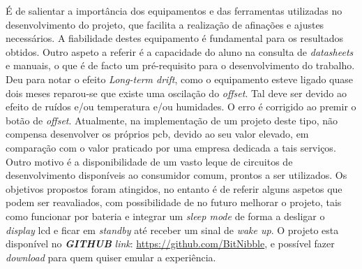 \emptyline
É de salientar a importância dos equipamentos e das ferramentas utilizadas no desenvolvimento do projeto, que facilita a realização de afinações e ajustes necessários. A fiabilidade destes equipamento é fundamental para os resultados obtidos.
Outro aspeto a referir é a capacidade do aluno na consulta de \textit{datasheets} e manuais, o que é de facto um pré-requisito para o desenvolvimento do trabalho.
\emptyline
Deu para notar o efeito \textit{Long-term drift}, como o equipamento esteve ligado quase dois meses reparou-se que existe uma oscilação do \textit{offset}. Tal deve ser devido ao efeito de ruídos e/ou temperatura e/ou humidades. O erro é corrigido ao premir o botão de \textit{offset}.
\emptyline
Atualmente, na implementação de um projeto deste tipo, não compensa desenvolver os próprios \acs{pcb}, devido ao seu valor elevado, em comparação com o valor praticado por uma empresa dedicada a tais serviços. Outro motivo é a disponibilidade  de um vasto leque de circuitos de desenvolvimento disponíveis ao consumidor comum, prontos a ser utilizados.
\emptyline
Os objetivos propostos foram atingidos, no entanto é de referir alguns aspetos que podem ser reavaliados, com possibilidade de no futuro melhorar o projeto, tais como funcionar por bateria e integrar um \textit{sleep mode} de forma a desligar o \textit{display} \acs{lcd} e ficar em \textit{standby} até receber um sinal de \textit{wake up}.
\emptyline
O projeto esta disponível no \textit{\textbf{GITHUB}} \textit{link}: \url{https://github.com/BitNibble}, e possível fazer \textit{download} para quem quiser emular a experiência.
\begin{comment}
Sensitivity,Long-Term Drift e Temperature Effects (Span temperature hysteresis).
\end{comment}
